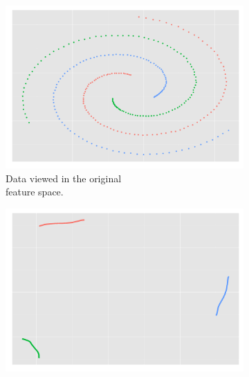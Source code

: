 \begin{figure}[h!]
  \centering
  \begin{subfigure}{0.4\textwidth}
    \centering
    \includegraphics[width = \textwidth, height = \textwidth]{code_embedding/3_spiral_original.png}
    \caption{Data viewed in the original \\ feature space.}
  \label{fig:spirals_original}
  \end{subfigure}
  \begin{subfigure}{0.4\textwidth}
    \centering
    \includegraphics[width =\textwidth, height = \textwidth]{code_embedding/3_spiral_embedded.png}

\end{subfigure}
\end{figure}
